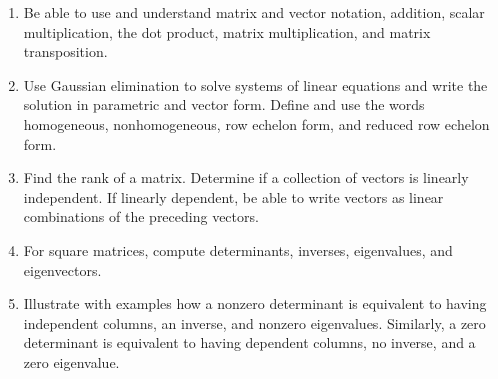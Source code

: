 
\begin{enumerate}

\item Be able to use and understand matrix and vector notation, addition, scalar multiplication, the dot product, matrix multiplication, and matrix transposition. 
\item Use Gaussian elimination to solve systems of linear equations and write the solution in parametric and vector form. Define and use the words homogeneous, nonhomogeneous, row echelon form, and reduced row echelon form. 
\item Find the rank of a matrix. Determine if a collection of vectors is linearly independent. If linearly dependent, be able to write vectors as linear combinations of the preceding vectors.
\item For square matrices, compute determinants, inverses, eigenvalues, and eigenvectors. 
\item Illustrate with examples how a nonzero determinant is equivalent to having independent columns, an inverse, and nonzero eigenvalues. Similarly, a zero determinant is equivalent to having dependent columns, no inverse, and a zero eigenvalue. 

\end{enumerate}

